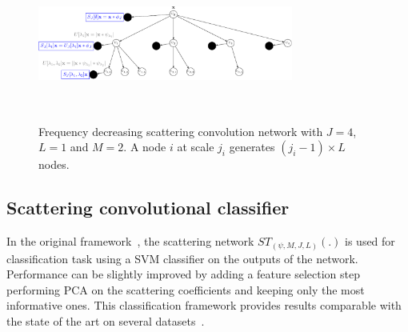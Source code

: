 \documentclass{article}
\begin{document}
    \begin{figure}
      \begin{center}
        \includegraphics[width=3.3in, height=2in, keepaspectratio]{ST_freqDec_crop.pdf}
        \caption[Frequency decreasing scattering convolution network.]{\centering  Frequency decreasing scattering convolution network with $J=4$, $L=1$ and $M=2$. A node $i$ at scale $j_{i}$ generates $(j_{i}-1) \times L$ nodes. }
        \label{fig:SCN 2}
      \end{center}
      \vspace{-15pt}
    \end{figure}
  
  \vspace{-5pt}
  \subsection{Scattering convolutional classifier}
    \label{subsec:SCN/SCC}
    \vspace{-5pt}
    In the original framework~\cite{bruna2013scattering}, the scattering network $ST_{(\psi, M,J,L)}(.)$ is used for classification task using a SVM classifier on the outputs of the network. Performance can be slightly improved by adding a feature selection step performing PCA on the scattering coefficients and keeping only the most informative ones. This classification framework provides results comparable with the state of the art on several datasets~\cite{bruna2010classification}.
\end{document}
